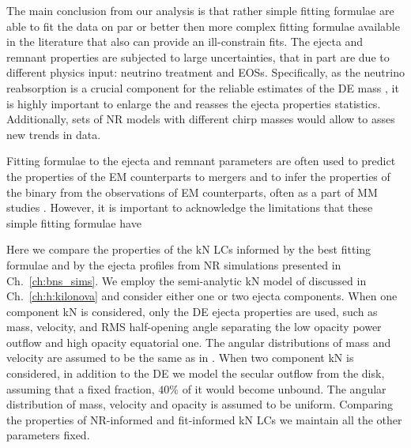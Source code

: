 The main conclusion from our analysis is that rather simple fitting formulae are able 
to fit the data on par or better then more complex fitting formulae available in the 
literature that also can provide an ill-constrain fits.
The ejecta and remnant properties are subjected to large uncertainties, that in part 
are due to different physics input: neutrino treatment and \acp{EOS}.
Specifically, as the neutrino reabsorption is a crucial component for the reliable 
estimates of the \ac{DE} mass 
\citep[\eg][]{Wanajo:2014wha,Sekiguchi:2015dma,Perego:2017wtu,Foucart:2018gis},
it is highly important to enlarge the \DSheatcool{} and reasses the ejecta properties 
statistics. 
%
Additionally, sets of \ac{NR} models with different chirp masses would allow to asses 
new trends in data.

Fitting formulae to the ejecta and remnant parameters are often used to predict the 
properties of the \ac{EM} counterparts to mergers and to infer the properties of the 
binary from the observations of \ac{EM} counterparts, often as a part of \ac{MM} studies 
\citep{Dietrich:2020efo,Breschi:2021tbm,Nicholl:2021rcr}.
%
However, it is important to acknowledge the limitations that these simple 
fitting formulae have 

Here we compare the properties of the \ac{kN} \acp{LC} informed by the best fitting 
formulae and by the ejecta profiles from \ac{NR} simulations presented in 
Ch.~\ref{ch:bns_sims}. %
We employ the semi-analytic \ac{kN} model of \citet{Perego:2017wtu} discussed in 
Ch.~\ref{ch:h:kilonova} and consider either one or two ejecta components.
%
When one component \ac{kN} is considered, only the \ac{DE} ejecta properties are used, 
such as mass, velocity, and \ac{RMS} half-opening angle separating the low opacity 
power outflow and high opacity equatorial one. The angular distributions of mass and velocity 
are assumed to be the same as in \citet{Perego:2017wtu}.
When two component \ac{kN} is considered, in addition to the \ac{DE} we model the 
secular outflow from the disk, assuming that a fixed fraction, $40\%$ of it would 
become unbound. The angular distribution of mass, velocity and opacity
is assumed to be uniform. 
Comparing the properties of \ac{NR}-informed and fit-informed \ac{kN} \acp{LC} we 
maintain all the other parameters fixed.
%

